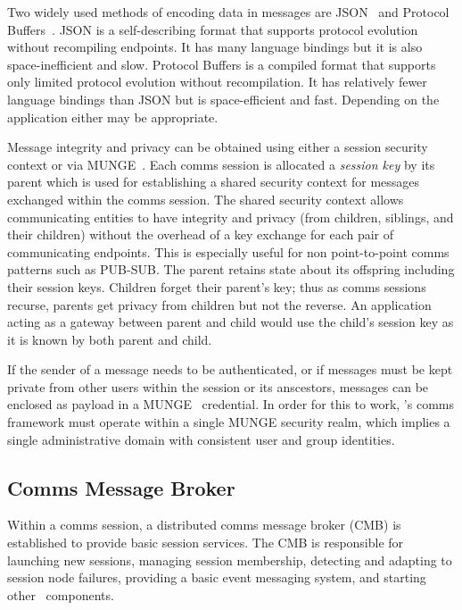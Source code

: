 Two widely used methods of encoding data in messages are
JSON~\cite{rfc4627} 
and Protocol Buffers~\cite{Protobuf}.
JSON is a self-describing format
that supports protocol evolution without recompiling endpoints.  It has
many language bindings but it is also space-inefficient and slow.
Protocol Buffers is a compiled format that supports
only limited protocol evolution without recompilation.  It has relatively
fewer language bindings than JSON but is space-efficient and fast.
Depending on the application either may be appropriate.

Message integrity and privacy can be obtained using either a session
security context or via MUNGE~\cite{MUNGE}.
Each comms session is allocated a {\em session key} by its parent
which is used for establishing a shared security context
for messages exchanged within the comms session.
The shared security context allows communicating entities to have integrity
and privacy (from children, siblings, and their children)
without the overhead
of a key exchange for each pair of communicating endpoints.
This is especially useful for non point-to-point comms patterns such as PUB-SUB.
The parent retains state about its offspring including their session keys.
Children forget their parent's key;  thus as comms sessions recurse,
parents get privacy from children but not the reverse.
An application acting as a gateway between parent and child would use
the child's session key as it is known by both parent and child.

If the sender of a message needs to be authenticated, or if messages must
be kept private from other users within the session or its anscestors,
messages can be enclosed as payload in a MUNGE~\cite{MUNGE}
credential.
In order for this to work, \ngrm's comms framework must operate within a
single MUNGE security realm,
which implies a single administrative domain with consistent
user and group identities.
\newpage
\subsection{Comms Message Broker}
\label{sect:cmb}

Within a comms session, a distributed comms message broker (CMB)
is established to provide basic session services.
The CMB is responsible for launching new sessions,
managing session membership,
detecting and adapting to session node failures,
providing a basic event messaging system,
and starting other \ngrm\ components.

